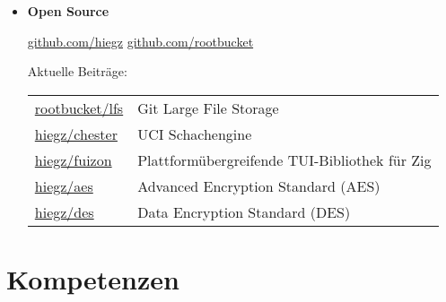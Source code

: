 \documentclass[]{article}
\begin{document}
\begin{itemize}[leftmargin=0.15in, rightmargin=0.15in, label={}]
    \item {\large\bfseries Open Source}

        \:\: { \href{https://github.com/hiegz}{\ttfamily github.com/hiegz}}
        \:\: { \href{https://github.com/rootbucket}{\ttfamily github.com/rootbucket}}

        \vspace{7pt}
        \hspace{5pt}
        Aktuelle Beiträge:

        \hspace{20pt}
        \begin{tabular}{@{}lp{8cm}}
            \href{https://github.com/rootbucket/lfs}{\ttfamily rootbucket/lfs} & Git Large File Storage \\[3pt]
            \href{https://github.com/hiegz/chester}{\ttfamily hiegz/chester}   & UCI Schachengine \\[3pt]
            \href{https://github.com/hiegz/fuizon}{\ttfamily hiegz/fuizon}     & Plattformübergreifende TUI-Bibliothek für Zig \\[3pt]
            \href{https://github.com/hiegz/aes}{\ttfamily hiegz/aes}           & Advanced Encryption Standard (AES) \\[3pt]
            \href{https://github.com/hiegz/des}{\ttfamily hiegz/des}           & Data Encryption Standard (DES)
        \end{tabular}
\end{itemize}

\section{Kompetenzen}
\end{document}
